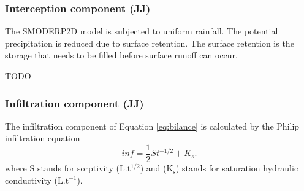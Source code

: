 
        \subsubsection{Interception component (JJ)}
            The SMODERP2D model is subjected to uniform rainfall. The potential
            precipitation is reduced due to surface retention. The surface
            retention is the storage that needs to be filled before surface
            runoff can occur. 

            TODO

        \subsubsection{Infiltration component (JJ) }
            The infiltration component of Equation \ref{eq:bilance} is calculated by the
            Philip infiltration equation \citep{philip1957}
            \begin{equation} 
            inf = \frac{1}{2}St^{-1/2}+K_s.
            \label{eq:infiltration}
            \end{equation} 
            where S stands for sorptivity ($\mathrm{L.t^{1/2}}$) and ($\mathrm{K_s}$)
            stands for saturation hydraulic conductivity ($\mathrm{L.t^{-1}}$).

